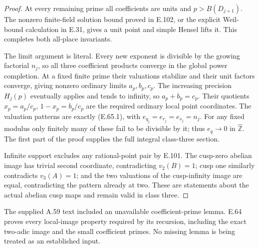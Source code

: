 \begin{proof}
At every remaining prime all
coefficients are units and
$p>B(D_{j+1})$. The nonzero
finite-field solution bound
proved in E.102, or the explicit
Weil-bound calculation in E.31,
gives a unit point and simple
Hensel lifts it. This completes
both all-place invariants.

The limit argument is literal.
Every new exponent is divisible
by the growing factorial $n_j$,
so all three coefficient products
converge in the global power
completion. At a fixed finite
prime their valuations stabilize
and their unit factors converge,
giving nonzero ordinary limits
$a_p,b_p,c_p$.
The increasing precision
$H_j(p)$ eventually applies
and tends to infinity, so
$a_p+b_p=c_p$. Their quotients
$x_p=a_p/c_p$,
$1-x_p=b_p/c_p$ are the required
ordinary local point coordinates.
The valuation patterns are
exactly (E.65.1), with
$e_{q_j}=e_{r_j}=e_{s_j}=n_j$.
For any fixed modulus only
finitely many of these fail
to be divisible by it; thus
$e_q\to0$ in $\widehat{\mathbb Z}$.
The first part of the proof
supplies the full integral
class-three section.

Infinite support excludes any
rational-point pair by E.101.
The cusp-zero abelian image has
trivial second coordinate,
contradicting $v_2(B)=1$;
cusp one similarly contradicts
$v_3(A)=1$; and the two
valuations of the cusp-infinity
image are equal, contradicting
the pattern already at two.
These are statements about the
actual abelian cusp maps and
remain valid in class three.
\end{proof}

The supplied A.59 text included an
unavailable coefficient-prime lemma.
E.64 proves every local-image
property required by its recursion,
including the exact two-adic image
and the small coefficient primes.
No missing lemma is being treated
as an established input.
